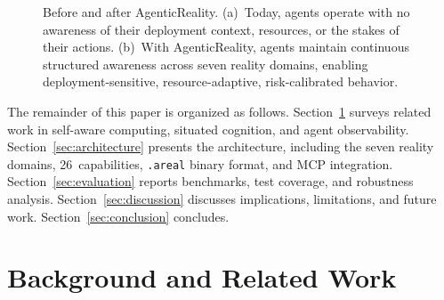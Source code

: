 \documentclass[10pt, twocolumn]{article}
\begin{document}
\begin{figure}[t]
\caption{Before and after AgenticReality. (a)~Today, agents operate with no awareness of their deployment context, resources, or the stakes of their actions. (b)~With AgenticReality, agents maintain continuous structured awareness across seven reality domains, enabling deployment-sensitive, resource-adaptive, risk-calibrated behavior.}
\label{fig:before_after}
\end{figure}

The remainder of this paper is organized as follows. Section~\ref{sec:background} surveys related work in self-aware computing, situated cognition, and agent observability. Section~\ref{sec:architecture} presents the architecture, including the seven reality domains, 26~capabilities, \texttt{.areal} binary format, and MCP integration. Section~\ref{sec:evaluation} reports benchmarks, test coverage, and robustness analysis. Section~\ref{sec:discussion} discusses implications, limitations, and future work. Section~\ref{sec:conclusion} concludes.


\section{Background and Related Work}
\label{sec:background}
\end{document}
